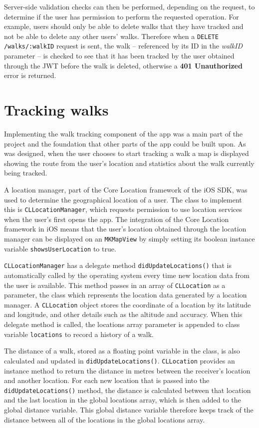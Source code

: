 Server-side validation checks can then be performed, depending on the request, to determine if the user has permission to perform the requested operation. For example, users should only be able to delete walks that they have tracked and not be able to delete any other users' walks. Therefore when a \verb|DELETE /walks/:walkID| request is sent, the walk -- referenced by its ID in the \textit{walkID} parameter -- is checked to see that it has been tracked by the user obtained through the JWT before the walk is deleted, otherwise a \textbf{401 Unauthorized} error is returned.

\section{Tracking walks} \label{section:tracking-walks}

Implementing the walk tracking component of the app was a main part of the project and the foundation that other parts of the app could be built upon. As was designed, when the user chooses to start tracking a walk a map is displayed showing the route from the user's location and statistics about the walk currently being tracked.

A location manager, part of the Core Location framework of the iOS SDK, was used to determine the geographical location of a user. The class to implement this is \verb|CLLocationManager|, which requests permission to use location services when the user's first opens the app. The integration of the Core Location framework in iOS means that the user's location obtained through the location manager can be displayed on an \verb|MKMapView| by simply setting its boolean instance variable \verb|showsUserLocation| to true.

\verb|CLLocationManager| has a delegate method \verb|didUpdateLocations()| that is automatically called by the operating system every time new location data from the user is available. This method passes in an array of \verb|CLLocation| as a parameter, the class which represents the location data generated by a location manager. A \verb|CLLocation| object stores the coordinate of a location by its latitude and longitude, and other details such as the altitude and accuracy. When this delegate method is called, the locations array parameter is appended to class variable \verb|locations| to record a history of a walk.

The distance of a walk, stored as a floating point variable in the class, is also calculated and updated in \verb|didUpdateLocations()|. \verb|CLLocation| provides an instance method to return the distance in metres between the receiver's location and another location. For each new location that is passed into the \verb|didUpdateLocations()| method, the distance is calculated between that location and the last location in the global locations array, which is then added to the global distance variable. This global distance variable therefore keeps track of the distance between all of the locations in the global locations array.

